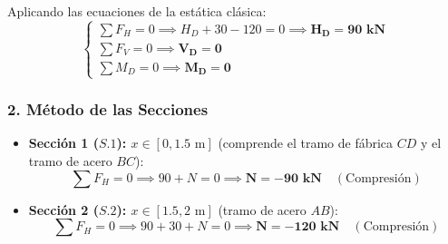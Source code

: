 Aplicando las ecuaciones de la estática clásica:
\begin{equation}
    \begin{cases}
        \sum F_H = 0 \implies H_D + 30 - 120 = 0 \implies \mathbf{H_D = 90\text{ kN}} \\
        \sum F_V = 0 \implies \mathbf{V_D = 0} \\
        \sum M_D = 0 \implies \mathbf{M_D = 0}
    \end{cases}
\end{equation}

\subsubsection*{2. Método de las Secciones}
\begin{itemize}
    \item \textbf{Sección 1 ($S.1$): $x \in [0, 1.5\text{ m}]$} (comprende el tramo de fábrica $CD$ y el tramo de acero $BC$):
    \begin{equation}
        \sum F_H = 0 \implies 90 + N = 0 \implies \mathbf{N = -90\text{ kN}} \quad (\text{Compresión})
    \end{equation}

    \item \textbf{Sección 2 ($S.2$): $x \in [1.5, 2\text{ m}]$} (tramo de acero $AB$):
    \begin{equation}
        \sum F_H = 0 \implies 90 + 30 + N = 0 \implies \mathbf{N = -120\text{ kN}} \quad (\text{Compresión})
    \end{equation}
\end{itemize}

